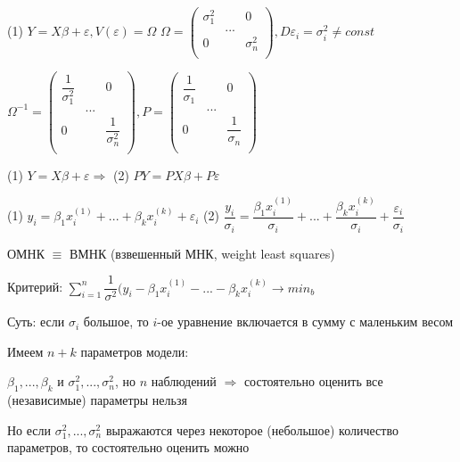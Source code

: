 \documentclass{article}
\begin{document}
(1) $Y = X\beta + \varepsilon, V(\varepsilon) = \Omega$
$\Omega = \begin{pmatrix}
\sigma^2_1 & & 0\\
& ... & \\
0 & & \sigma^2_n \\
\end{pmatrix}, D\varepsilon_i = \sigma^2_i \neq const $ \par 
$\Omega^{-1} = \begin{pmatrix}
\dfrac{1}{\sigma^2_1} & & 0\\
& ... & \\
0 & & \dfrac{1}{\sigma^2_n} \\
\end{pmatrix},  P = \begin{pmatrix}
\dfrac{1}{\sigma_1} & & 0\\
& ... & \\
0 & & \dfrac{1}{\sigma_n} \\
\end{pmatrix}$ \par 

\vspace{1mm}
(1) $Y = X\beta + \varepsilon \Longrightarrow$ (2) $PY = PX\beta + P\varepsilon$

\vspace{1mm}
(1) $y_i = \beta_1x_i^{(1)} + ... + \beta_kx_i^{(k)} + \varepsilon_i$ (2) $\dfrac{y_i}{\sigma_i} = \dfrac{\beta_1x_i^{(1)}}{\sigma_i} + ... + \dfrac{\beta_kx_i^{(k)}}{\sigma_i} + \dfrac{\varepsilon_i}{\sigma_i}$

ОМНК $\equiv$ ВМНК (взвешенный МНК, weight least squares)

\vspace{2mm}
Критерий: $\sum_{i = 1}^n\dfrac{1}{\sigma^2}(y_i - \beta_1x_i^{(1)} - ... - \beta_kx_i^{(k)} \longrightarrow min_b$ 

\vspace{2mm}
Суть: если $\sigma_i$ большое, то $i$-ое уравнение включается в сумму с маленьким весом 

\vspace{2mm}
Имеем $n+k$ параметров модели: \par 
$\beta_1, ... , \beta_k $ и $\sigma^2_1, ... , \sigma^2_n$, но $n$ наблюдений $\Longrightarrow$ состоятельно оценить все (независимые) параметры нельзя
 
Но если $\sigma^2_1, ... , \sigma^2_n$ выражаются через некоторое (небольшое) количество параметров, то состоятельно оценить можно 
\end{document}
